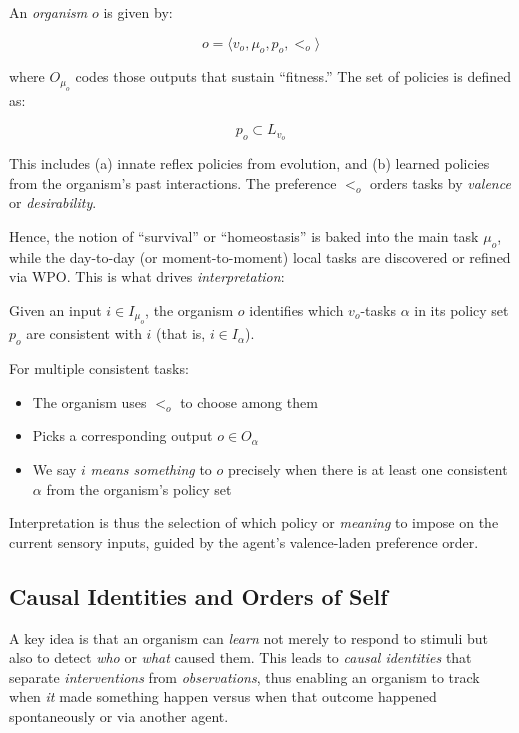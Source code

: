\documentclass[12pt,letterpaper]{article}
\begin{document}
\begin{definition}[Organism]
An \textit{organism} $o$ is given by:

\[
   o = \langle v_o, \mu_o, p_o, <_o \rangle
\]

where $O_{\mu_o}$ codes those outputs that sustain ``fitness.'' The set of policies is defined as:

\[
   p_o \subset L_{v_o}
\]

This includes (a) innate reflex policies from evolution, and (b) learned policies from the organism's past interactions. The preference $<_o$ orders tasks by \textit{valence} or \textit{desirability}.
\end{definition}

Hence, the notion of ``survival'' or ``homeostasis'' is baked into the main task $\mu_o$, while the day-to-day (or moment-to-moment) local tasks are discovered or refined via WPO. This is what drives \textit{interpretation}:

\begin{definition}[Interpretation]
Given an input $i \in I_{\mu_o}$, the organism $o$ identifies which $v_o$-tasks $\alpha$ in its policy set $p_o$ are consistent with $i$ (that is, $i \in I_{\alpha}$).

For multiple consistent tasks:
\begin{itemize}
\item The organism uses $<_o$ to choose among them
\item Picks a corresponding output $o \in O_{\alpha}$
\item We say $i$ \textit{means something} to $o$ precisely when there is at least one consistent $\alpha$ from the organism's policy set
\end{itemize}
\end{definition}

Interpretation is thus the selection of which policy or \textit{meaning} to impose on the current sensory inputs, guided by the agent's valence-laden preference order.

\subsection{Causal Identities and Orders of Self}

A key idea is that an organism can \textit{learn} not merely to respond to stimuli but also to detect \textit{who} or \textit{what} caused them. This leads to \textit{causal identities} that separate \textit{interventions} from \textit{observations}, thus enabling an organism to track when \textit{it} made something happen versus when that outcome happened spontaneously or via another agent.
\end{document}
